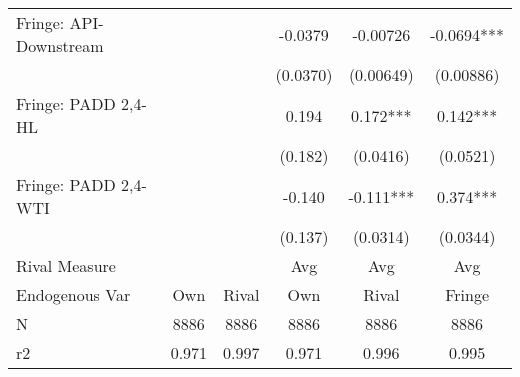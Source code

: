 {\begin{tabular}{l*{5}{c}}
\addlinespace
Fringe: API-Downstream&            &            &  -0.0379   & -0.00726   &  -0.0694***\\
                &            &            & (0.0370)   &(0.00649)   &(0.00886)   \\
\addlinespace
Fringe: PADD 2,4-HL&            &            &    0.194   &    0.172***&    0.142***\\
                &            &            &  (0.182)   & (0.0416)   & (0.0521)   \\
\addlinespace
Fringe: PADD 2,4-WTI&            &            &   -0.140   &   -0.111***&    0.374***\\
                &            &            &  (0.137)   & (0.0314)   & (0.0344)   \\
\midrule
Rival Measure   &            &            &      Avg   &      Avg   &      Avg   \\
Endogenous Var  &      Own   &    Rival   &      Own   &    Rival   &   Fringe   \\
N               &     8886   &     8886   &     8886   &     8886   &     8886   \\
r2              &    0.971   &    0.997   &    0.971   &    0.996   &    0.995   \\
\bottomrule
\end{tabular}
}
